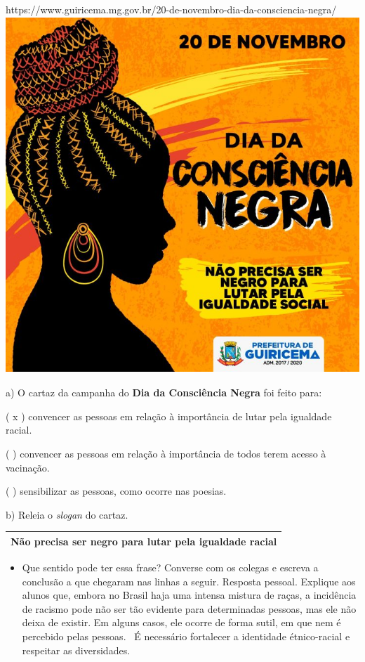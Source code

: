 \begin{itemize}
{{{\begin{itemize}
\begin{itemize}
https://www.guiricema.mg.gov.br/20-de-novembro-dia-da-consciencia-negra/\includegraphics[width=5.28125in,height=5.28125in]{media/image14.jpeg}

a) O cartaz da campanha do \textbf{Dia da Consciência Negra} foi feito
para:

( x ) convencer as pessoas em relação à importância de lutar pela
igualdade racial.

( ) convencer as pessoas em relação à importância de todos terem acesso
à vacinação.

( ) sensibilizar as pessoas, como ocorre nas poesias.

b) Releia o \emph{slogan} do cartaz.

\begin{longtable}[]{@{}l@{}}
\toprule
\textbf{Não precisa ser negro para lutar pela igualdade
racial}\tabularnewline
\bottomrule
\end{longtable}

\begin{itemize}
\item
  Que sentido pode ter essa frase? Converse com os colegas e escreva a
  conclusão a que chegaram nas linhas a seguir. Resposta pessoal.
  Explique aos alunos que, embora no Brasil haja uma intensa mistura de
  raças, a incidência de racismo pode não ser tão evidente para
  determinadas pessoas, mas ele não deixa de existir. Em alguns casos,
  ele ocorre de forma sutil, em que nem é percebido pelas pessoas. ~É
  necessário fortalecer a identidade étnico-racial e respeitar as
  diversidades.
\end{itemize}


\end{itemize}
\end{itemize}}}}
\end{itemize}
